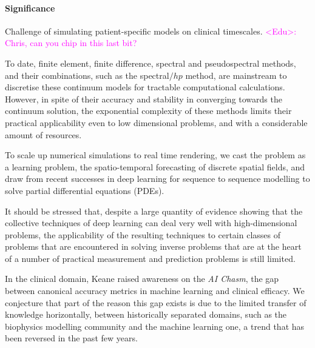 \documentclass{article}
\newcommand{\Edu}[1]{\textcolor{magenta}{<Edu>: #1}}
\begin{document}
        \paragraph{Significance}
            Challenge of simulating patient-specific models on clinical timescales. \Edu{Chris, can you chip in this last bit?}
            
            
            To date, finite element, finite difference, spectral and pseudospectral methods, and their combinations, such as the spectral$/hp$ method, are mainstream to discretise these continuum models for tractable computational calculations.
            However, in spite of their accuracy and stability in converging towards the continuum solution, the exponential complexity of these methods limits their practical applicability even to low dimensional problems, and with a considerable amount of resources.
            
            To scale up numerical simulations to real time rendering, we cast the problem as a learning problem, the spatio-temporal forecasting of discrete spatial fields, and draw from recent successes in deep learning for sequence to sequence modelling to solve partial differential equations (PDEs).
            
            It should be stressed that, despite a large quantity of evidence showing that the collective techniques of deep learning can deal very well with high-dimensional problems, the applicability of the resulting techniques to certain classes of problems that are encountered in solving inverse problems that are at the heart of a number of practical measurement and prediction problems is still limited.
            
            In the clinical domain, Keane\cite{Keane2018WithDiagnosis} raised awareness on the \textit{AI Chasm}, the gap between canonical accuracy metrics in machine learning and clinical efficacy.
            We conjecture that part of the reason this gap exists is due to the limited transfer of knowledge horizontally, between historically separated domains, such as the biophysics modelling community and the machine learning one, a trend that has been reversed in the past few years.
            
            
\end{document}
